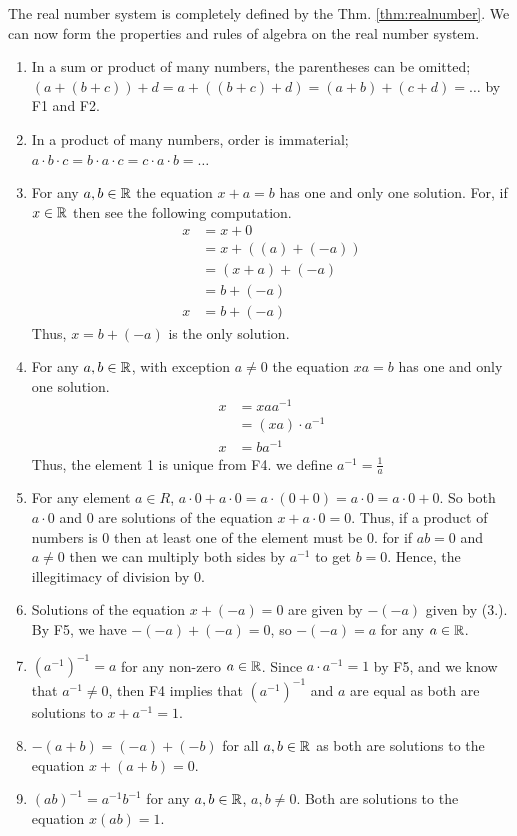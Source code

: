 The real number system is completely defined by the Thm. \ref{thm:realnumber}. We can now form the properties and rules of algebra on the real number system. 

\begin{enumerate}
    \item In a sum or product of many numbers, the parentheses can be omitted; $(a + (b + c)) + d = a + ((b + c) + d) = (a + b) + (c + d) = \dots$ by F1 and F2.
    \item  In a product of many numbers, order is immaterial; $a \cdot b \cdot c = b \cdot a \cdot c = c \cdot a \cdot b = \dots$
    \item For any $a,b \in \mathbb{R}$ the equation $x + a = b$ has one and only one solution. For, if $x\in \mathbb{R}$ then see the following computation.
    \begin{align*}
        x &= x + 0\\
        &= x + ((a) + (-a))\\
        &= (x + a) +(- a)\\
        &= b + (-a) \\
        x &= b + (-a)
    \end{align*}
    Thus, $x = b + (-a)$ is the only solution.
    \item For any $a,b \in \mathbb{R}$, with exception $a\neq 0$ the equation $xa = b$ has one and only one solution.
    \begin{align*}
        x &= xa a^{-1} \\
        &= (x a) \cdot a^{-1} \\
       x &= b a^{-1} 
    \end{align*}
    Thus, the element 1 is unique from F4. we define $a^{-1} = \frac{1}{a}$

    \item For any element $a\in R$, $a \cdot 0 + a \cdot 0 = a\cdot (0 + 0) = a \cdot 0 = a \cdot 0 + 0$. So both $a \cdot 0$ and $0$ are solutions of the equation $x + a \cdot 0 = 0$. Thus, if a product of numbers is 0 then at least one of the element must be 0. for if $ab = 0$ and $a\neq 0$ then we can multiply both sides by $a^{-1}$ to get $b = 0$. Hence, the illegitimacy of division by 0. 
    \item Solutions of the equation $x + (-a) = 0$ are given by $-(-a)$ given by (3.). By F5, we have $-(-a) + (-a) = 0$, so $-(-a) = a$ for any $a \in \mathbb{R}$.
    \item $(a^{-1})^{-1} = a$ for any non-zero $a \in \mathbb{R}$.  Since $a \cdot a^{-1} = 1$ by F5,  and we know that $a^{-1} \neq 0$, then F4 implies that  $(a^{-1})^{-1}$ and $a$ are equal as both are solutions to $x + a^{-1} = 1$.
    \item $-(a+b) = (-a) + (-b)$ for all $a,b \in \mathbb{R}$ as both are solutions to the equation $x + (a + b) = 0$. 
    \item $(ab)^{-1} = a^{-1} b^{-1}$ for any $a,b \in \mathbb{R}$, $a,b \neq 0$. Both are solutions to the equation $x(ab) = 1$. 
    

\end{enumerate}
